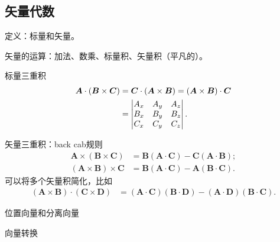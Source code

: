 \subsection{矢量代数}
\begin{compactitem}
	\item 定义：标量和矢量。
	\item 矢量的运算：加法、数乘、标量积、矢量积（平凡的）。
	\item 标量三重积
    \begin{align}
        \bm A\cdot(\bm B\times\bm C)&=\bm C\cdot(\bm A\times\bm B)=(\bm A\times\bm B)\cdot\bm C\\\notag
        &=\begin{vmatrix}
            A_x&A_y&A_z\\
            B_x&B_y&B_z\\
            C_x&C_y&C_z
        \end{vmatrix}.
    \end{align}
    \item 矢量三重积：back cab规则
    \begin{align}
        \label{eqn:bac-cab}
        \bm A\times(\bm B\times\bm C)&=\bm B(\bm A\cdot\bm C)-\bm C(\bm A\cdot\bm B);\\
        (\bm A\times\bm B)\times\bm C&=\bm B(\bm A\cdot\bm C)-\bm A(\bm B\cdot\bm C).
    \end{align}
    可以将多个矢量积简化，比如
    \begin{align*}
        (\bm A\times\bm B)\cdot(\bm C\times\bm D)&=(\bm A\cdot\bm C)(\bm B\cdot\bm D)-(\bm A\cdot\bm D)(\bm B\cdot\bm C).
    \end{align*}
    \item 位置向量和分离向量
    \item 向量转换
\end{compactitem}
